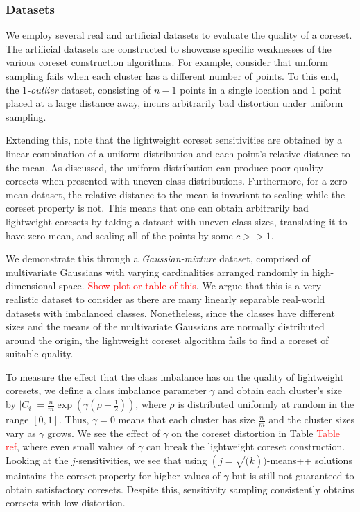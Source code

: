 \subsubsection{Datasets}

We employ several real and artificial datasets to evaluate the quality of a coreset.  The artificial datasets are constructed to showcase specific weaknesses of
the various coreset construction algorithms. For example, consider that uniform sampling fails when each cluster has a different number of points. To this end,
the \emph{$1$-outlier} dataset, consisting of $n-1$ points in a single location and $1$ point placed at a large distance away, incurs arbitrarily bad distortion
under uniform sampling. 

Extending this, note that the lightweight coreset sensitivities are obtained by a linear combination of a uniform distribution and each point's relative
distance to the mean. As discussed, the uniform distribution can produce poor-quality coresets when presented with uneven class distributions. Furthermore, for
a zero-mean dataset, the relative distance to the mean is invariant to scaling while the coreset property is not. This means that one can obtain arbitrarily
bad lightweight coresets by taking a dataset with uneven class sizes, translating it to have zero-mean, and scaling all of the points by some $c >> 1$.

We demonstrate this through a \emph{Gaussian-mixture} dataset, comprised of multivariate Gaussians with varying cardinalities arranged randomly in
high-dimensional space. \textcolor{red}{Show plot or table of this}. We argue that this is a very realistic dataset to consider as there are many linearly
separable real-world datasets with imbalanced classes. Nonetheless, since the classes have different sizes and the means of the multivariate Gaussians are
normally distributed around the origin, the lightweight coreset algorithm fails to find a coreset of suitable quality. 

To measure the effect that the class imbalance has on the quality of lightweight coresets, we define a class imbalance parameter $\gamma$ and obtain each
cluster's size by $|C_i| = \frac{n}{m} \exp \left( \gamma(\rho - \frac{1}{2}) \right)$, where $\rho$ is distributed uniformly at random in the range $[0, 1]$.
Thus, $\gamma = 0$ means that each cluster has size $\frac{n}{m}$ and the cluster sizes vary as $\gamma$ grows. We see the effect of $\gamma$ on the coreset
distortion in Table \textcolor{red}{Table ref}, where even small values of $\gamma$ can break the lightweight coreset construction. Looking at the
$j$-sensitivities, we see that using $(j=\sqrt(k))$-means++ solutions maintains the coreset property for higher values of $\gamma$ but is still not guaranteed
to obtain satisfactory coresets. Despite this, sensitivity sampling consistently obtains coresets with low distortion.

